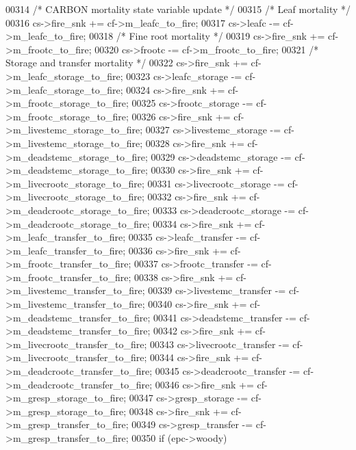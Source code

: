 \begin{DoxyCode}
00314     \textcolor{comment}{/* CARBON mortality state variable update */}    
00315     \textcolor{comment}{/*   Leaf mortality */}
00316     cs->fire\_snk       += cf->m\_leafc\_to\_fire;
00317     cs->leafc          -= cf->m\_leafc\_to\_fire;
00318     \textcolor{comment}{/*   Fine root mortality */}
00319     cs->fire\_snk       += cf->m\_frootc\_to\_fire;
00320     cs->frootc         -= cf->m\_frootc\_to\_fire;
00321     \textcolor{comment}{/*   Storage and transfer mortality */}
00322     cs->fire\_snk            += cf->m\_leafc\_storage\_to\_fire;
00323     cs->leafc\_storage       -= cf->m\_leafc\_storage\_to\_fire;
00324     cs->fire\_snk            += cf->m\_frootc\_storage\_to\_fire;
00325     cs->frootc\_storage      -= cf->m\_frootc\_storage\_to\_fire;
00326     cs->fire\_snk            += cf->m\_livestemc\_storage\_to\_fire;
00327     cs->livestemc\_storage   -= cf->m\_livestemc\_storage\_to\_fire;
00328     cs->fire\_snk            += cf->m\_deadstemc\_storage\_to\_fire;
00329     cs->deadstemc\_storage   -= cf->m\_deadstemc\_storage\_to\_fire;
00330     cs->fire\_snk            += cf->m\_livecrootc\_storage\_to\_fire;
00331     cs->livecrootc\_storage  -= cf->m\_livecrootc\_storage\_to\_fire;
00332     cs->fire\_snk            += cf->m\_deadcrootc\_storage\_to\_fire;
00333     cs->deadcrootc\_storage  -= cf->m\_deadcrootc\_storage\_to\_fire;
00334     cs->fire\_snk            += cf->m\_leafc\_transfer\_to\_fire;
00335     cs->leafc\_transfer      -= cf->m\_leafc\_transfer\_to\_fire;
00336     cs->fire\_snk            += cf->m\_frootc\_transfer\_to\_fire;
00337     cs->frootc\_transfer     -= cf->m\_frootc\_transfer\_to\_fire;
00338     cs->fire\_snk            += cf->m\_livestemc\_transfer\_to\_fire;
00339     cs->livestemc\_transfer  -= cf->m\_livestemc\_transfer\_to\_fire;
00340     cs->fire\_snk            += cf->m\_deadstemc\_transfer\_to\_fire;
00341     cs->deadstemc\_transfer  -= cf->m\_deadstemc\_transfer\_to\_fire;
00342     cs->fire\_snk            += cf->m\_livecrootc\_transfer\_to\_fire;
00343     cs->livecrootc\_transfer -= cf->m\_livecrootc\_transfer\_to\_fire;
00344     cs->fire\_snk            += cf->m\_deadcrootc\_transfer\_to\_fire;
00345     cs->deadcrootc\_transfer -= cf->m\_deadcrootc\_transfer\_to\_fire;
00346     cs->fire\_snk            += cf->m\_gresp\_storage\_to\_fire;
00347     cs->gresp\_storage       -= cf->m\_gresp\_storage\_to\_fire;
00348     cs->fire\_snk            += cf->m\_gresp\_transfer\_to\_fire;
00349     cs->gresp\_transfer      -= cf->m\_gresp\_transfer\_to\_fire;
00350     \textcolor{keywordflow}{if} (epc->woody)

\end{DoxyCode}
